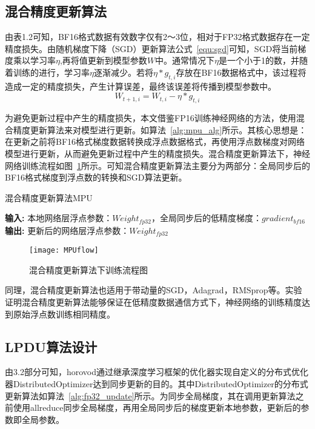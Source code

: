 \subsection{混合精度更新算法}
由表1.2可知，BF16格式数据有效数字仅有2～3位，相对于FP32格式数据存在一定精度损失。由随机梯度下降（SGD）更新算法公式~\ref{equ:sgd}可知，SGD将当前梯度乘以学习率$\eta$,再将值更新到模型参数$W$中。通常情况下$\eta$是一个小于1的数，并随着训练的进行，学习率$\eta$逐渐减少。若将$\eta*g_{t,i}$存放在BF16数据格式中，该过程将造成一定的精度损失，产生计算误差，最终该误差将传播到模型参数中。
\begin{equation}
\label{equ:sgd}
W_{t+1,i}=W_{t,i}-\eta*g_{t,i}
\end{equation}

为避免更新过程中产生的精度损失，本文借鉴FP16训练神经网络的方法，使用混合精度更新算法来对模型进行更新。如算法~\ref{alg:mpu_alg}所示。其核心思想是：在更新之前将BF16格式梯度数据转换成浮点数据格式，再使用浮点数梯度对网络模型进行更新，从而避免更新过程中产生的精度损失。混合精度更新算法下，神经网络训练流程如图~\ref{fig:MPUflow}所示。可知混合精度更新算法主要分为两部分：全局同步后的BF16格式梯度到浮点数的转换和SGD算法更新。

\begin{algorithm}\small
\caption{混合精度更新算法MPU}
\textbf{输入:}
本地网络层浮点参数：$Weight_{fp32}$，全局同步后的低精度梯度：$gradient_{bf16}$ \\
\textbf{输出:} 
更新后的网络层浮点参数：$Weight_{fp32}$
\begin{algorithmic}[1]
\end{algorithmic}
	\label{alg:mpu_alg}
\end{algorithm}

\begin{figure}[htp]
\centering
\texttt{[image: MPUflow]}
\caption{混合精度更新算法下训练流程图}
\label{fig:MPUflow}
\end{figure}


同理，混合精度更新算法也适用于带动量的SGD，Adagrad，RMSprop等。实验证明混合精度更新算法能够保证在低精度数据通信方式下，神经网络的训练精度达到原始浮点数训练相同精度。

\subsection{LPDU算法设计}
由3.2部分可知，horovod通过继承深度学习框架的优化器实现自定义的分布式优化器DistributedOptimizer达到同步更新的目的。其中DistributedOptimizer的分布式更新算法如算法~\ref{alg:fp32_update}所示。为同步全局梯度，其在调用更新算法之前使用allreduce同步全局梯度，再用全局同步后的梯度更新本地参数，更新后的参数即全局参数。

